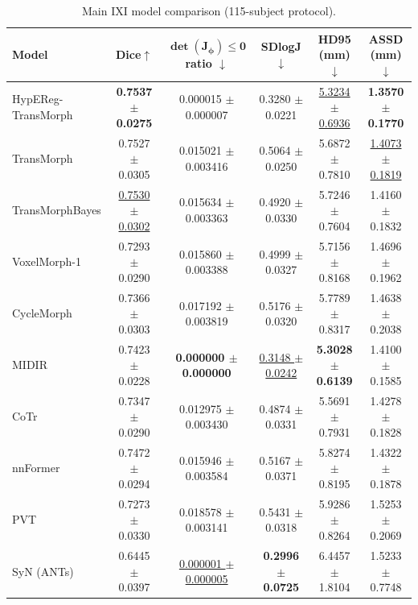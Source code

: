 \documentclass[jimaging,article,submit,pdftex,moreauthors]{Definitions/mdpi}
\newcommand{\best}[1]{\textcolor{BestColor}{\textbf{#1}}}
\newcommand{\snd}[1]{\textcolor{SndColor}{\underline{#1}}}
\begin{document}
\begin{table}[H]
\caption{Main IXI model comparison (115-subject protocol).\label{tab2}}
\centering
\scriptsize
\setlength{\tabcolsep}{3pt}
\begin{tabularx}{\textwidth}{lccccc}
\toprule
\textbf{Model} & \textbf{Dice\(\uparrow\)} & \(\boldsymbol{\det(J_\phi)\le 0}\) \textbf{ratio \(\downarrow\)} & \textbf{SDlogJ\(\downarrow\)} & \textbf{HD95 (mm)\(\downarrow\)} & \textbf{ASSD (mm)\(\downarrow\)}\\
\midrule
HypEReg-TransMorph & \best{0.7537 \(\pm\) 0.0275} & 0.000015 \(\pm\) 0.000007 & 0.3280 \(\pm\) 0.0221 & \snd{5.3234 \(\pm\) 0.6936} & \best{1.3570 \(\pm\) 0.1770}\\
TransMorph & 0.7527 \(\pm\) 0.0305 & 0.015021 \(\pm\) 0.003416 & 0.5064 \(\pm\) 0.0250 & 5.6872 \(\pm\) 0.7810 & \snd{1.4073 \(\pm\) 0.1819}\\
TransMorphBayes & \snd{0.7530 \(\pm\) 0.0302} & 0.015634 \(\pm\) 0.003363 & 0.4920 \(\pm\) 0.0330 & 5.7246 \(\pm\) 0.7604 & 1.4160 \(\pm\) 0.1832\\
VoxelMorph-1 & 0.7293 \(\pm\) 0.0290 & 0.015860 \(\pm\) 0.003388 & 0.4999 \(\pm\) 0.0327 & 5.7156 \(\pm\) 0.8168 & 1.4696 \(\pm\) 0.1962\\
CycleMorph & 0.7366 \(\pm\) 0.0303 & 0.017192 \(\pm\) 0.003819 & 0.5176 \(\pm\) 0.0320 & 5.7789 \(\pm\) 0.8317 & 1.4638 \(\pm\) 0.2038\\
MIDIR & 0.7423 \(\pm\) 0.0228 & \best{0.000000 \(\pm\) 0.000000} & \snd{0.3148 \(\pm\) 0.0242} & \best{5.3028 \(\pm\) 0.6139} & 1.4100 \(\pm\) 0.1585\\
CoTr & 0.7347 \(\pm\) 0.0290 & 0.012975 \(\pm\) 0.003430 & 0.4874 \(\pm\) 0.0331 & 5.5691 \(\pm\) 0.7931 & 1.4278 \(\pm\) 0.1828\\
nnFormer & 0.7472 \(\pm\) 0.0294 & 0.015946 \(\pm\) 0.003584 & 0.5167 \(\pm\) 0.0371 & 5.8274 \(\pm\) 0.8195 & 1.4322 \(\pm\) 0.1878\\
PVT & 0.7273 \(\pm\) 0.0330 & 0.018578 \(\pm\) 0.003141 & 0.5431 \(\pm\) 0.0318 & 5.9286 \(\pm\) 0.8264 & 1.5253 \(\pm\) 0.2069\\
SyN (ANTs) & 0.6445 \(\pm\) 0.0397 & \snd{0.000001 \(\pm\) 0.000005} & \best{0.2996 \(\pm\) 0.0725} & 6.4457 \(\pm\) 1.8104 & 1.5233 \(\pm\) 0.7748\\
\bottomrule
\end{tabularx}
\end{table}
\end{document}
